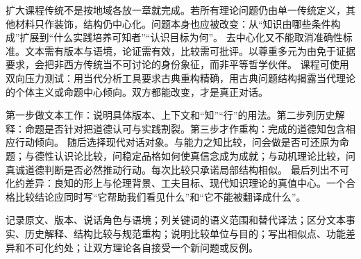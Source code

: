 扩大课程传统不是按地域各放一章就完成。若所有理论问题仍由单一传统定义，其他材料只作装饰，结构仍中心化。问题本身也应被改变：从“知识由哪些条件构成”扩展到“什么实践培养可知者”“认识目标为何”。 去中心化又不能取消准确性标准。文本需有版本与语境，论证需有效，比较需可批评。以尊重多元为由免于证据要求，会把非西方传统当不可讨论的身份象征，而非平等哲学伙伴。 课程可使用双向压力测试：用当代分析工具要求古典重构精确，用古典问题结构揭露当代理论的个体主义或命题中心倾向。双方都能改变，才是真正对话。

第一步做文本工作：说明具体版本、上下文和“知”“行”的用法。第二步列历史解释：命题是否针对把道德认可与实践割裂\parencite{tiwald2014}。第三步才作重构：完成的道德知包含相应行动倾向。 随后选择现代对话对象。与能力之知比较，问会做是否可还原为命题；与德性认识论比较，问稳定品格如何使真信念成为成就；与动机理论比较，问真诚道德判断是否必然推动行动。每次比较只承诺局部结构相似。 最后列出不可化约差异：良知的形上与伦理背景、工夫目标、现代知识理论的真值中心。一个合格比较结论应同时写“它帮助我们看见什么”和“它不能被翻译成什么”。

\begin{tcolorbox}[breakable,colback=white,colframe=blue!30!black,title={比较研究工作表},fonttitle=\bfseries]
记录原文、版本、说话角色与语境；列关键词的语义范围和替代译法；区分文本事实、历史解释、结构比较与规范重构；说明比较单位与目的；写出相似点、功能差异和不可化约处；让双方理论各自接受一个新问题或反例。
\end{tcolorbox}
